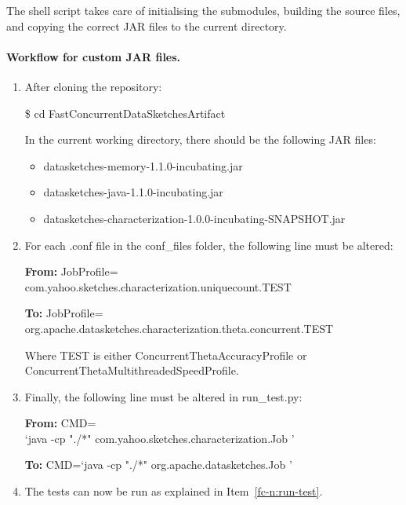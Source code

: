 \noindent The shell script takes care of initialising the submodules, building the source files, and copying the correct
JAR files to the current directory.


\paragraph{\textbf{Workflow for custom JAR files.}}

\begin{enumerate}
  \item After cloning the repository:

  \begin{framed}

  \$ cd FastConcurrentDataSketchesArtifact

  \end{framed}

  \noindent In the current working directory, there should be the following JAR files:

  \begin{itemize}
    \item datasketches-memory-1.1.0-incubating.jar
    \item datasketches-java-1.1.0-incubating.jar
    \item datasketches-characterization-1.0.0-incubating-SNAPSHOT.jar
  \end{itemize}

  \item For each .conf file in the conf\_files folder, the following line must be altered:
  
  \noindent \textbf{From:} JobProfile=\\com.yahoo.sketches.characterization.uniquecount.TEST

  \noindent \textbf{To:} JobProfile= \\ org.apache.datasketches.characterization.theta.concurrent.TEST

  \noindent Where TEST is either ConcurrentThetaAccuracyProfile or ConcurrentThetaMultithreadedSpeedProfile.

  \item Finally, the following line must be altered in run\_test.py:
  
  \noindent \textbf{From:} CMD=\\`java -cp "./*" com.yahoo.sketches.characterization.Job {}'

  \noindent \textbf{To:} CMD=`java -cp "./*" org.apache.datasketches.Job {}'

  \item The tests can now be run as explained in Item~\ref{fc-n:run-test}.

\end{enumerate}
